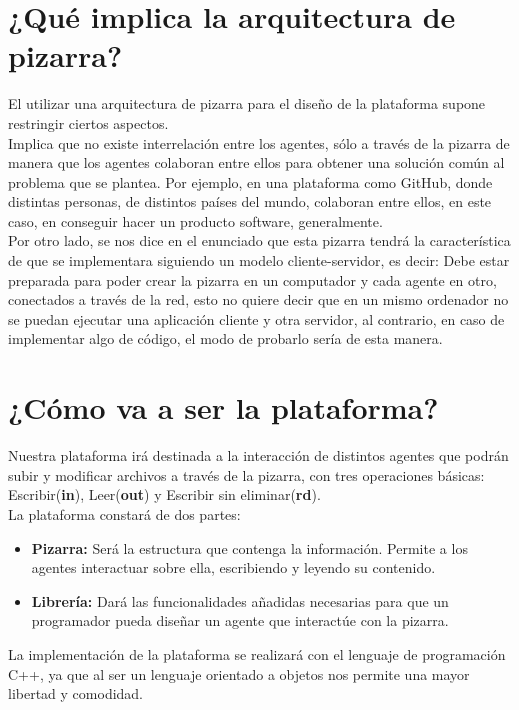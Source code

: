 \section{¿Qué implica la arquitectura de pizarra?}
El utilizar una arquitectura de pizarra para el diseño de la plataforma supone restringir ciertos aspectos.\\

Implica que no existe interrelación entre los agentes, sólo a través de la pizarra de manera que los agentes colaboran entre ellos para obtener una solución común al problema que se plantea. Por ejemplo, en una plataforma como GitHub, donde distintas personas, de distintos países del mundo, colaboran entre ellos, en este caso, en conseguir hacer un producto software, generalmente.\\

Por otro lado, se nos dice en el enunciado que esta pizarra tendrá la característica de que se implementara siguiendo un modelo cliente-servidor, es decir: Debe estar preparada para poder crear la pizarra en un computador y cada agente en otro, conectados a través de la red, esto no quiere decir que en un mismo ordenador no se puedan ejecutar una aplicación cliente y otra servidor, al contrario, en caso de implementar algo de código, el modo de probarlo sería de esta manera.

\section{¿Cómo va a ser la plataforma?}
Nuestra plataforma irá destinada a la interacción de distintos agentes que podrán subir y modificar archivos a través de la pizarra, con tres operaciones básicas: Escribir(\textbf{in}), Leer(\textbf{out}) y Escribir sin eliminar(\textbf{rd}).\\

La plataforma constará de dos partes:
\begin{itemize}
	\item \textbf{Pizarra: }Será la estructura que contenga la información. Permite a los agentes interactuar sobre ella, escribiendo y leyendo su contenido.
	\item \textbf{Librería: }Dará las funcionalidades añadidas necesarias para que un programador pueda diseñar un agente que interactúe con la pizarra. 
\end{itemize}

La implementación de la plataforma se realizará con el lenguaje de programación C++, ya que al ser un lenguaje orientado a objetos nos permite una mayor libertad y comodidad.
